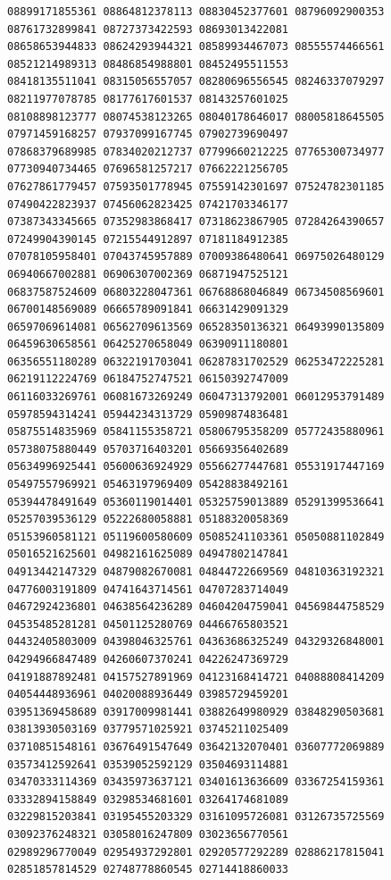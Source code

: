 \documentclass[9pt]{article}
\begin{document}
\begin{verbatim}
08899171855361 08864812378113 08830452377601 08796092900353 08761732899841 08727373422593 08693013422081
08658653944833 08624293944321 08589934467073 08555574466561 08521214989313 08486854988801 08452495511553
08418135511041 08315056557057 08280696556545 08246337079297 08211977078785 08177617601537 08143257601025
08108898123777 08074538123265 08040178646017 08005818645505 07971459168257 07937099167745 07902739690497
07868379689985 07834020212737 07799660212225 07765300734977 07730940734465 07696581257217 07662221256705
07627861779457 07593501778945 07559142301697 07524782301185 07490422823937 07456062823425 07421703346177
07387343345665 07352983868417 07318623867905 07284264390657 07249904390145 07215544912897 07181184912385
07078105958401 07043745957889 07009386480641 06975026480129 06940667002881 06906307002369 06871947525121
06837587524609 06803228047361 06768868046849 06734508569601 06700148569089 06665789091841 06631429091329
06597069614081 06562709613569 06528350136321 06493990135809 06459630658561 06425270658049 06390911180801
06356551180289 06322191703041 06287831702529 06253472225281 06219112224769 06184752747521 06150392747009
06116033269761 06081673269249 06047313792001 06012953791489 05978594314241 05944234313729 05909874836481
05875514835969 05841155358721 05806795358209 05772435880961 05738075880449 05703716403201 05669356402689
05634996925441 05600636924929 05566277447681 05531917447169 05497557969921 05463197969409 05428838492161
05394478491649 05360119014401 05325759013889 05291399536641 05257039536129 05222680058881 05188320058369
05153960581121 05119600580609 05085241103361 05050881102849 05016521625601 04982161625089 04947802147841
04913442147329 04879082670081 04844722669569 04810363192321 04776003191809 04741643714561 04707283714049
04672924236801 04638564236289 04604204759041 04569844758529 04535485281281 04501125280769 04466765803521
04432405803009 04398046325761 04363686325249 04329326848001 04294966847489 04260607370241 04226247369729
04191887892481 04157527891969 04123168414721 04088808414209 04054448936961 04020088936449 03985729459201
03951369458689 03917009981441 03882649980929 03848290503681 03813930503169 03779571025921 03745211025409
03710851548161 03676491547649 03642132070401 03607772069889 03573412592641 03539052592129 03504693114881
03470333114369 03435973637121 03401613636609 03367254159361 03332894158849 03298534681601 03264174681089
03229815203841 03195455203329 03161095726081 03126735725569 03092376248321 03058016247809 03023656770561
02989296770049 02954937292801 02920577292289 02886217815041 02851857814529 02748778860545 02714418860033

\end{verbatim}
\end{document}
